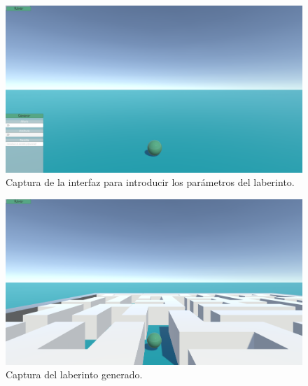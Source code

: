\begin{figure}[!h]  
    \centering  
    \includegraphics[width=\textwidth]{img/IntroducirParametrosLaberinto.png}  
    \caption{Captura de la interfaz para introducir los parámetros del laberinto.}  
    \label{fig:ParametrosLaberinto}
\end{figure}

\begin{figure}[!h]  
    \centering  
    \includegraphics[width=\textwidth]{img/LaberintoGenerado.png}  
    \caption{Captura del laberinto generado.}  
    \label{fig:LaberintoGenerado}
\end{figure}